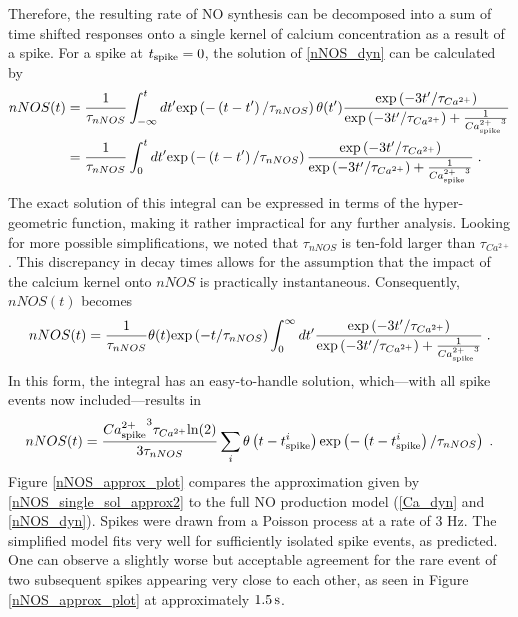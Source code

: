 \documentclass[10pt,a4paper]{article}
\begin{document}
Therefore, the resulting rate of NO synthesis can be decomposed into a sum of time shifted responses onto a single kernel of calcium concentration as a result of a spike. For a spike at $t_{\rm spike}=0$, the solution of \eqref{nNOS_dyn} can be calculated by
\begin{equation}
\begin{split}
nNOS(t) &= \frac{1}{\tau_{nNOS}}\int_{-\infty}^t dt' \mathrm{exp} \left( - \left( t-t' \right) /\tau_{nNOS} \right)  \mathrm{\theta} (t') \frac{\mathrm{exp} \left( -3t'/\tau_{Ca^{2+}} \right) }{\mathrm{exp} \left( -3t'/\tau_{Ca^{2+}} \right) + \frac{1}{{Ca^{2+}_{\rm spike}}^3}} \\
&= \frac{1}{\tau_{nNOS}}\int_{0}^t dt' \mathrm{exp} \left( - \left( t-t' \right) /\tau_{nNOS} \right)  \frac{\mathrm{exp} \left( -3t'/\tau_{Ca^{2+}} \right) }{\mathrm{exp} \left( -3t'/\tau_{Ca^{2+}} \right) + \frac{1}{{Ca^{2+}_{\rm spike}}^3}}\;.
\end{split}\label{nNOS_single_sol}
\end{equation}
The exact solution of this integral can be expressed in terms of the hyper-geometric function, making it rather impractical for any further analysis. Looking for more possible simplifications, we noted that $\tau_{nNOS}$ is ten-fold larger than $\tau_{Ca^{2+}}$. This discrepancy in decay times allows for the assumption that the impact of the calcium kernel onto $nNOS$ is practically instantaneous. Consequently, $nNOS(t)$ becomes
\begin{equation}
nNOS(t) = \frac{1}{\tau_{nNOS}} \mathrm{\theta}(t) \mathrm{exp} \left( -t/\tau_{nNOS} \right) \int_{0}^\infty dt' \frac{\mathrm{exp} \left( -3t'/\tau_{Ca^{2+}} \right) }{\mathrm{exp} \left( -3t'/\tau_{Ca^{2+}} \right) + \frac{1}{{Ca^{2+}_{\rm spike}}^3}}\;.
\label{nNOS_single_sol_approx1}
\end{equation}
In this form, the integral has an easy-to-handle solution, which---with all spike events now included---results in
\begin{equation}
nNOS(t) = \frac{{Ca^{2+}_{\rm spike}}^3 \tau_{Ca^{2+}} \mathrm{ln} (2) }{3\tau_{nNOS}} \sum_i \mathrm{\theta} \left( t-t^i_{\rm spike} \right) \mathrm{exp} \left( - \left( t-t^i_{\rm spike} \right) /\tau_{nNOS} \right) \;.
\label{nNOS_single_sol_approx2}
\end{equation}
Figure \ref{nNOS_approx_plot} compares the approximation given by \eqref{nNOS_single_sol_approx2} to the full NO production model (\eqref{Ca_dyn} and \eqref{nNOS_dyn}). Spikes were drawn from a Poisson process at a rate of 3 Hz. The simplified model fits very well for sufficiently isolated spike events, as predicted. One can observe a slightly worse but acceptable agreement for the rare event of two subsequent spikes appearing very close to each other, as seen in Figure \ref{nNOS_approx_plot} at approximately $\rm 1.5\, s$.
\end{document}

